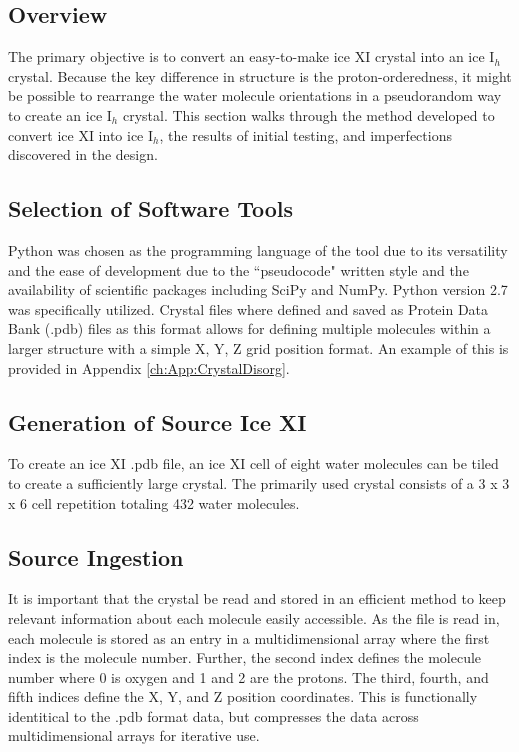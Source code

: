 \subsection{Overview}

The primary objective is to convert an easy-to-make ice XI crystal into an ice I$_{h}$ crystal.
Because the key difference in structure is the proton-orderedness, it might be possible to rearrange the water molecule orientations in a pseudorandom way to create an ice I$_{h}$ crystal.
This section walks through the method developed to convert ice XI into ice I$_{h}$, the results of initial testing, and imperfections discovered in the design.

\subsection{Selection of Software Tools}

Python was chosen as the programming language of the tool due to its versatility and the ease of development due to the ``pseudocode" written style and the availability of scientific packages including SciPy and NumPy. 
Python version 2.7 was specifically utilized.
Crystal files where defined and saved as Protein Data Bank (.pdb) files as this format allows for defining multiple molecules within a larger structure with a simple X, Y, Z grid position format. 
An example of this is provided in Appendix \ref{ch:App:CrystalDisorg}.

\subsection{Generation of Source Ice XI}

To create an ice XI .pdb file, an ice XI cell of eight water molecules can be tiled to create a sufficiently large crystal.
The primarily used crystal consists of a 3 x 3 x 6 cell repetition totaling 432 water molecules.

\subsection{Source Ingestion}

It is important that the crystal be read and stored in an efficient method to keep relevant information about each molecule easily accessible. 
As the file is read in, each molecule is stored as an entry in a multidimensional array where the first index is the molecule number. 
Further, the second index defines the molecule number where 0 is oxygen and 1 and 2 are the protons. 
The third, fourth, and fifth indices define the X, Y, and Z position coordinates. 
This is functionally identitical to the .pdb format data, but compresses the data across multidimensional arrays for iterative use.

